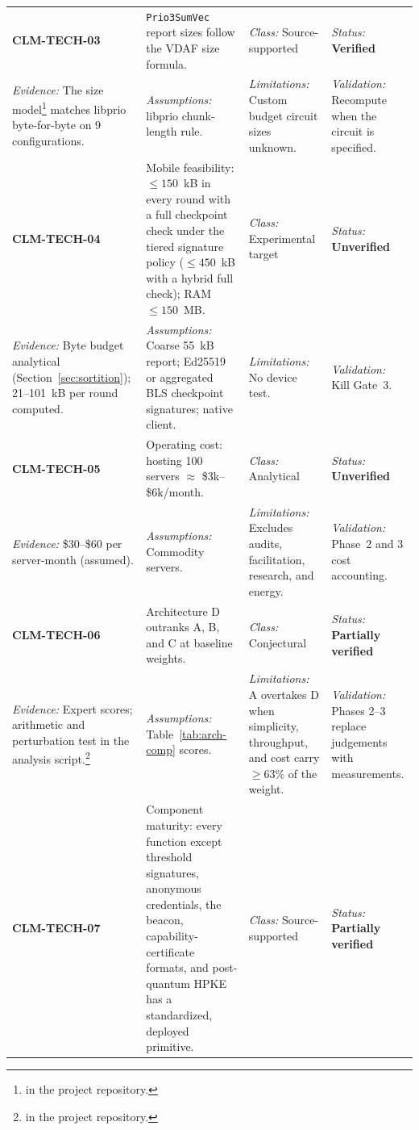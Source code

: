\documentclass[10pt,twoside,openany]{book}
\theoremstyle{dpepstyle}
\begin{document}
{\begin{longtable}{L{0.92in} L{1.42in} L{1.07in} L{1.12in}}
\addlinespace[1pt]\midrule
\textbf{CLM-TECH-03} & \texttt{Prio3SumVec} report sizes follow the VDAF size formula. & \emph{Class:} Source-supported & \emph{Status:} \textbf{Verified} \\*
\emph{Evidence:} The size model\footnote{ in the project repository.} matches libprio byte-for-byte on 9 configurations. & \emph{Assumptions:} libprio chunk-length rule. & \emph{Limitations:} Custom budget circuit sizes unknown. & \emph{Validation:} Recompute when the circuit is specified. \\
\addlinespace[1pt]\midrule
\textbf{CLM-TECH-04} & Mobile feasibility: $\le 150$~kB in every round with a full checkpoint check under the tiered signature policy ($\le 450$~kB with a hybrid full check); RAM $\le 150$~MB. & \emph{Class:} Experimental target & \emph{Status:} \textbf{Unverified} \\*
\emph{Evidence:} Byte budget analytical (Section~\ref{sec:sortition}); 21--101~kB per round computed. & \emph{Assumptions:} Coarse 55~kB report; Ed25519 or aggregated BLS checkpoint signatures; native client. & \emph{Limitations:} No device test. & \emph{Validation:} Kill Gate~3. \\
\addlinespace[1pt]\midrule
\textbf{CLM-TECH-05} & Operating cost: hosting 100 servers $\approx$ \$3k--\$6k/month. & \emph{Class:} Analytical & \emph{Status:} \textbf{Unverified} \\*
\emph{Evidence:} \$30--\$60 per server-month (assumed). & \emph{Assumptions:} Commodity servers. & \emph{Limitations:} Excludes audits, facilitation, research, and energy. & \emph{Validation:} Phase~2 and 3 cost accounting. \\
\addlinespace[1pt]\midrule
\textbf{CLM-TECH-06} & Architecture D outranks A, B, and C at baseline weights. & \emph{Class:} Conjectural & \emph{Status:} \textbf{Partially verified} \\*
\emph{Evidence:} Expert scores; arithmetic and perturbation test in the analysis script.\footnote{ in the project repository.} & \emph{Assumptions:} Table~\ref{tab:arch-comp} scores. & \emph{Limitations:} A overtakes D when simplicity, throughput, and cost carry $\ge 63\%$ of the weight. & \emph{Validation:} Phases 2--3 replace judgements with measurements. \\
\addlinespace[1pt]\midrule
\textbf{CLM-TECH-07} & Component maturity: every function except threshold signatures, anonymous credentials, the beacon, capability-certificate formats, and post-quantum HPKE has a standardized, deployed primitive. & \emph{Class:} Source-supported & \emph{Status:} \textbf{Partially verified} \\*

\end{longtable}}
\end{document}
